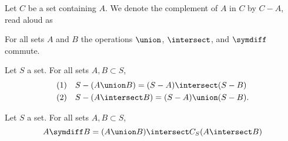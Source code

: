 Let $C$ be a set containing $A$.
We denote the complement of $A$ in $C$ by $C - A$, read aloud as 


\begin{prop}
  For all sets $A$ and $B$ the operations $\union$, $\intersect$, and $\symdiff$ commute.
\end{prop}

\begin{prop}
  Let $S$ a set.
  For all sets $A, B \subset S$,
  \[
    \begin{aligned}
      \text{(1)} \quad & S - (A \union B) = (S - A) \intersect (S - B) \\
      \text{(2)} \quad & S - (A \intersect B) = (S - A) \union (S - B).
    \end{aligned}
  \]
\end{prop}

\begin{prop}
  Let $S$ a set. For all sets $A, B \subset S$,
  \[
    A \symdiff B = (A \union B) \intersect C_S(A \intersect B)
  \]
\end{prop}
\strats
